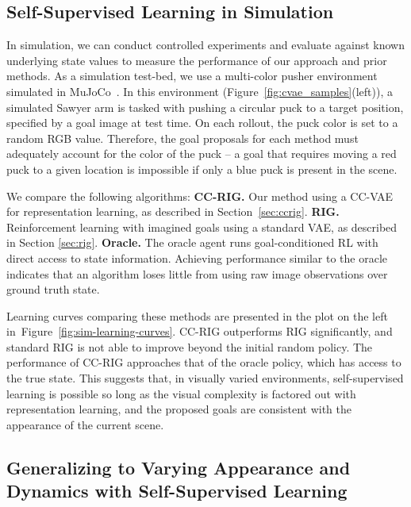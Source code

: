 \documentclass{article}
\begin{document}
\subsection{Self-Supervised Learning in Simulation}

In simulation, we can conduct controlled experiments and evaluate against known underlying state values to measure the performance of our approach and prior methods. As a simulation test-bed, we use a multi-color pusher environment simulated in MuJoCo~\cite{todorov12mujoco}. In this environment (Figure~\ref{fig:cvae_samples}(left)),
a simulated Sawyer arm is tasked with pushing a circular puck to a target position, specified by a goal image at test time. On each rollout, the puck color is set to a random RGB value. Therefore, the goal proposals for each method must adequately account for the color of the puck -- a goal that requires moving a red puck to a given location is impossible if only a blue puck is present in the scene.

We compare the following algorithms:
\textbf{CC-RIG.} Our method using a CC-VAE for representation learning, as described in Section~\ref{sec:ccrig}.
\textbf{RIG.} Reinforcement learning with imagined goals \cite{nair2018rig} using a standard VAE, as described in Section \ref{sec:rig}.
\textbf{Oracle.} The oracle agent runs goal-conditioned RL with direct access to state information. Achieving performance similar to the oracle indicates that an algorithm loses little from using raw image observations over ground truth state.

Learning curves comparing these methods are presented in the plot on the left in~Figure~\ref{fig:sim-learning-curves}. CC-RIG outperforms RIG significantly, and standard RIG is not able to improve beyond the initial random policy. The performance of CC-RIG approaches that of the oracle policy, which has access to the true state. This suggests that, in visually varied environments, self-supervised learning is possible so long as the visual complexity is factored out with representation learning, and the proposed goals are consistent with the appearance of the current scene.

\subsection{Generalizing to Varying Appearance and Dynamics with Self-Supervised Learning}
\end{document}
